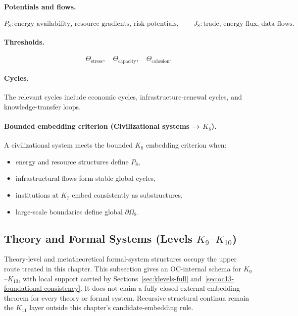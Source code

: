 \paragraph{Potentials and flows.}
\[
  P_8: \text{energy availability, resource gradients, risk potentials},\qquad
  J_8: \text{trade, energy flux, data flows}.
\]

\paragraph{Thresholds.}
\[
  \Theta_{\mathrm{stress}},\quad
  \Theta_{\mathrm{capacity}},\quad
  \Theta_{\mathrm{cohesion}}.
\]

\paragraph{Cycles.}
The relevant cycles include economic cycles, infrastructure-renewal cycles,
and knowledge-transfer loops.

\paragraph{Bounded embedding criterion (Civilizational systems → \texorpdfstring{\(K_8\)}{K8}).}
A civilizational system meets the bounded \(K_8\) embedding criterion when:
\begin{itemize}
  \item energy and resource structures define \(P_8\),
  \item infrastructural flows form stable global cycles,
  \item institutions at \(K_7\) embed consistently as substructures,
  \item large-scale boundaries define global \(\partial\Omega_8\).
\end{itemize}

\subsection{Theory and Formal Systems (Levels \texorpdfstring{$K_9$}{K9}--\texorpdfstring{$K_{10}$}{K10})}

Theory-level and metatheoretical formal-system structures occupy the upper
route treated in this chapter. This subsection gives an OC-internal schema for
\(K_9\)--\(K_{10}\), with local support carried by
Sections~\ref{sec:klevels-full} and~\ref{sec:oc13-foundational-consistency}.
It does not claim a fully closed external embedding theorem for every theory
or formal system. Recursive structural continua remain the \(K_{11}\) layer
outside this chapter's candidate-embedding rule.


